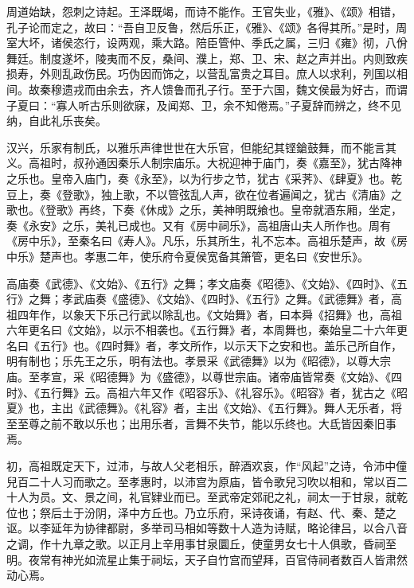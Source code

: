 \documentclass[12pt,UTF8]{ctexbook}
\begin{document}
周道始缺，怨刺之诗起。王泽既竭，而诗不能作。王官失业，《雅》、《颂》相错，孔子论而定之，故曰：“吾自卫反鲁，然后乐正，《雅》、《颂》各得其所。”是时，周室大坏，诸侯恣行，设两观，乘大路。陪臣管仲、季氏之属，三归《雍》彻，八佾舞廷。制度遂坏，陵夷而不反，桑间、濮上，郑、卫、宋、赵之声并出。内则致疾损寿，外则乱政伤民。巧伪因而饰之，以营乱富贵之耳目。庶人以求利，列国以相间。故秦穆遗戎而由余去，齐人馈鲁而孔子行。至于六国，魏文侯最为好古，而谓子夏曰：“寡人听古乐则欲寐，及闻郑、卫，余不知倦焉。”子夏辞而辨之，终不见纳，自此礼乐丧矣。



汉兴，乐家有制氏，以雅乐声律世世在大乐官，但能纪其铿鎗鼓舞，而不能言其义。高祖时，叔孙通因秦乐人制宗庙乐。大祝迎神于庙门，奏《嘉至》，犹古降神之乐也。皇帝入庙门，奏《永至》，以为行步之节，犹古《采荠》、《肆夏》也。乾豆上，奏《登歌》，独上歌，不以管弦乱人声，欲在位者遍闻之，犹古《清庙》之歌也。《登歌》再终，下奏《休成》之乐，美神明既飨也。皇帝就酒东厢，坐定，奏《永安》之乐，美礼已成也。又有《房中祠乐》，高祖唐山夫人所作也。周有《房中乐》，至秦名曰《寿人》。凡乐，乐其所生，礼不忘本。高祖乐楚声，故《房中乐》楚声也。孝惠二年，使乐府令夏侯宽备其箫管，更名曰《安世乐》。



高庙奏《武德》、《文始》、《五行》之舞；孝文庙奏《昭德》、《文始》、《四时》、《五行》之舞；孝武庙奏《盛德》、《文始》、《四时》、《五行》之舞。《武德舞》者，高祖四年作，以象天下乐己行武以除乱也。《文始舞》者，曰本舜《招舞》也，高祖六年更名曰《文始》，以示不相袭也。《五行舞》者，本周舞也，秦始皇二十六年更名曰《五行》也。《四时舞》者，孝文所作，以示天下之安和也。盖乐己所自作，明有制也；乐先王之乐，明有法也。孝景采《武德舞》以为《昭德》，以尊大宗庙。至孝宣，采《昭德舞》为《盛德》，以尊世宗庙。诸帝庙皆常奏《文始》、《四时》、《五行舞》云。高祖六年又作《昭容乐》、《礼容乐》。《昭容》者，犹古之《昭夏》也，主出《武德舞》。《礼容》者，主出《文始》、《五行舞》。舞人无乐者，将至至尊之前不敢以乐也；出用乐者，言舞不失节，能以乐终也。大氐皆因秦旧事焉。



初，高祖既定天下，过沛，与故人父老相乐，醉酒欢哀，作“风起”之诗，令沛中僮兒百二十人习而歌之。至孝惠时，以沛宫为原庙，皆令歌兒习吹以相和，常以百二十人为员。文、景之间，礼官肄业而已。至武帝定郊祀之礼，祠太一于甘泉，就乾位也；祭后土于汾阴，泽中方丘也。乃立乐府，采诗夜诵，有赵、代、秦、楚之讴。以李延年为协律都尉，多举司马相如等数十人造为诗赋，略论律吕，以合八音之调，作十九章之歌。以正月上辛用事甘泉圜丘，使童男女七十人俱歌，昏祠至明。夜常有神光如流星止集于祠坛，天子自竹宫而望拜，百官侍祠者数百人皆肃然动心焉。
\end{document}
